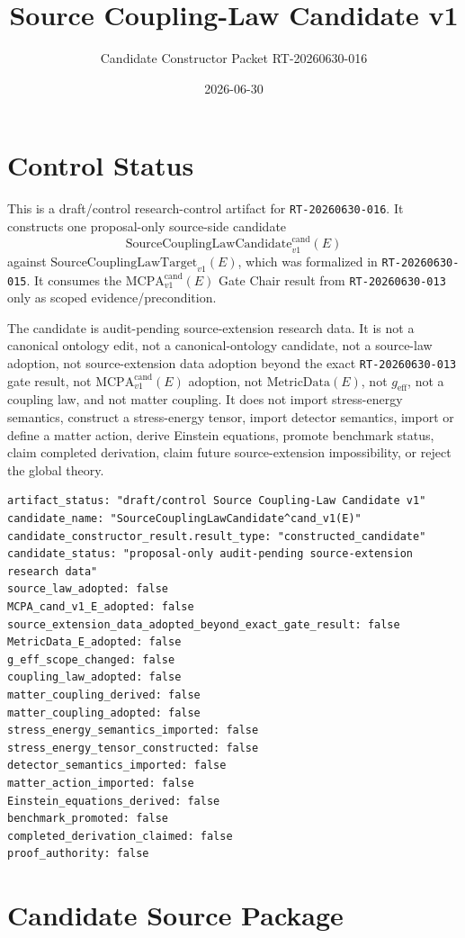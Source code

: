 \documentclass[11pt]{article}
\title{Source Coupling-Law Candidate v1}
\author{Candidate Constructor Packet RT-20260630-016}
\date{2026-06-30}
\newcommand{\MetricData}{\mathrm{MetricData}}
\newcommand{\geff}{g_{\mathrm{eff}}}
\newcommand{\MCPA}{\mathrm{MCPA}^{\mathrm{cand}}_{v1}}
\newcommand{\SourceCoupTarget}{\mathrm{SourceCouplingLawTarget}_{v1}}
\newcommand{\SourceCoupCand}{\mathrm{SourceCouplingLawCandidate}^{\mathrm{cand}}_{v1}}
\begin{document}
\maketitle

\section{Control Status}

This is a draft/control research-control artifact for
\texttt{RT-20260630-016}. It constructs one proposal-only source-side
candidate
\[
  \SourceCoupCand(E)
\]
against \(\SourceCoupTarget(E)\), which was formalized in
\texttt{RT-20260630-015}. It consumes the \(\MCPA(E)\) Gate Chair result from
\texttt{RT-20260630-013} only as scoped evidence/precondition.

The candidate is audit-pending source-extension research data. It is not a
canonical ontology edit, not a canonical-ontology candidate, not a source-law
adoption, not source-extension data adoption beyond the exact
\texttt{RT-20260630-013} gate result, not \(\MCPA(E)\) adoption, not
\(\MetricData(E)\), not \(\geff\), not a coupling law, and not matter
coupling. It does not import stress-energy semantics, construct a
stress-energy tensor, import detector semantics, import or define a matter
action, derive Einstein equations, promote benchmark status, claim completed
derivation, claim future source-extension impossibility, or reject the global
theory.

\begin{verbatim}
artifact_status: "draft/control Source Coupling-Law Candidate v1"
candidate_name: "SourceCouplingLawCandidate^cand_v1(E)"
candidate_constructor_result.result_type: "constructed_candidate"
candidate_status: "proposal-only audit-pending source-extension research data"
source_law_adopted: false
MCPA_cand_v1_E_adopted: false
source_extension_data_adopted_beyond_exact_gate_result: false
MetricData_E_adopted: false
g_eff_scope_changed: false
coupling_law_adopted: false
matter_coupling_derived: false
matter_coupling_adopted: false
stress_energy_semantics_imported: false
stress_energy_tensor_constructed: false
detector_semantics_imported: false
matter_action_imported: false
Einstein_equations_derived: false
benchmark_promoted: false
completed_derivation_claimed: false
proof_authority: false
\end{verbatim}

\section{Candidate Source Package}
\end{document}

